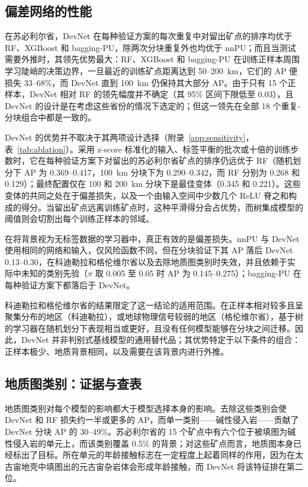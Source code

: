 \documentclass[pdflatex,sn-apa]{sn-jnl}
\begin{document}
\subsection{偏差网络的性能}\label{sec:disc-devnet}

在苏必利尔省，DevNet 在每种验证方案的每次重复中对留出矿点的排序均优于 RF、XGBoost 和 bagging-PU，除两次分块重复外也均优于 nnPU；而且当测试需要外推时，其领先优势最大：RF、XGBoost 和 bagging-PU 在训练正样本周围学习陡峭的决策边界，一旦最近的训练矿点距离达到 50--200~km，它们的 AP 便损失 33--68\%，而 DevNet 直到 100~km 仍保持其大部分 AP。由于只有 15 个正样本，DevNet 相对 RF 的领先幅度并不确定（其 95\% 区间下限低至 0.03），且 DevNet 的设计是在考虑这些省份的情况下选定的；但这一领先在全部 18 个重复-分块组合中都是一致的。

DevNet 的优势并不取决于其两项设计选择（附录~\ref{app:sensitivity}，表~\ref{tab:ablation}）。采用 z-score 标准化的输入、标签平衡的批次或十倍的训练步数时，它在每种验证方案下对留出的苏必利尔省矿点的排序仍远优于 RF（随机划分下 AP 为 0.369--0.417，100~km 分块下为 0.290--0.342，而 RF 分别为 0.268 和 0.129）；最终配置仅在 100 和 200~km 分块下是最佳变体（0.345 和 0.221）。这些变体的共同之处在于偏差损失，以及一个由输入空间中少数几个 ReLU 脊之和构成的得分。当留出矿点远离训练矿点时，这种平滑得分会占优势，而树集成模型的阈值则会切割出每个训练正样本的邻域。

在将背景视为无标签数据的学习器中，真正有效的是偏差损失。nnPU 与 DevNet 使用相同的网络和输入，仅风险函数不同，但在分块验证下其 AP 落后 DevNet 0.13--0.30，在科迪勒拉和格伦维尔省以及去除地质图类别时失效，并且依赖于实际中未知的类别先验（$\pi$ 取 0.005 至 0.05 时 AP 为 0.145--0.275）；bagging-PU 在每种验证方案下都落后于 DevNet。

科迪勒拉和格伦维尔省的结果限定了这一结论的适用范围。在正样本相对较多且呈聚集分布的地区（科迪勒拉），或地球物理信号较弱的地区（格伦维尔省），基于树的学习器在随机划分下表现相当或更好，且没有任何模型能够在分块之间迁移。因此，DevNet 并非判别式基线模型的通用替代品；其优势特定于以下条件的组合：正样本极少、地质背景相同，以及需要在该背景内进行外推。

\subsection{地质图类别：证据与查表}\label{sec:disc-mapclasses}

地质图类别对每个模型的影响都大于模型选择本身的影响。去除这些类别会使 DevNet 和 RF 损失约一半或更多的 AP，而单一类别——碱性侵入岩——贡献了 DevNet 分块 AP 的 30--49\%。苏必利尔省的 15 个矿点中有六个位于被填图为碱性侵入岩的单元上，而该类别覆盖 0.5\% 的背景；对这些矿点而言，地质图本身已经标出了目标。所在单元的年龄接触标志在一定程度上起着同样的作用，因为在太古宙地壳中填图出的元古宙杂岩体会形成年龄接触，而 DevNet 将该特征排在第二位。
\end{document}
